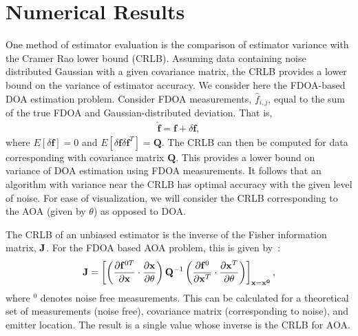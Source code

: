 \section{Numerical Results}
\label{s:numerics}

One method of estimator evaluation is the comparison of estimator variance with the Cramer Rao lower bound (CRLB). Assuming data containing noise distributed Gaussian with a given covariance matrix, the CRLB provides a lower bound on the variance of estimator accuracy. We consider here the FDOA-based DOA estimation problem. Consider FDOA measurements, $\hat{f}_{i,j}$, equal to the sum of the true FDOA and Gaussian-distributed deviation. That is,
\begin{align*}
\hat{\mathbf{f}} = \mathbf{f} + \delta \mathbf{f},
\end{align*}
where $E\left[\delta \mathbf{f}\right]=0$ and $E\left[\delta\mathbf{f}\delta\mathbf{f}^T\right]=\mathbf{Q}$. The CRLB can then be computed for data corresponding with covariance matrix $\mathbf{Q}$. This provides a lower bound on variance of DOA estimation using FDOA measurements. It follows that an algorithm with variance near the CRLB has optimal accuracy with the given level of noise. For ease of visualization, we will consider the CRLB corresponding to the AOA (given by $\theta$) as opposed to DOA.

The CRLB of an unbiased estimator is the inverse of the Fisher information matrix, $\mathbf{J}$. For the FDOA based AOA problem, this is given by~\cite{Ho1997}:
\begin{align*}
\mathbf{J} = \left[\left(\frac{\partial\mathbf{f}^{0T}}{\partial\mathbf{x}}\cdot\frac{\partial\mathbf{x}}{\partial\theta}\right)\mathbf{Q}^{-1}\left(\frac{\partial \mathbf{f}^0}{\partial\mathbf{x}^T}\cdot\frac{\partial\mathbf{x}^T}{\partial\theta}\right)\right]_{\mathbf{x=x^0}},
\end{align*}
where $^0$ denotes noise free measurements. This can be calculated for a theoretical set of measurements (noise free), covariance matrix (corresponding to noise), and emitter location. The result is a single value whose inverse is the CRLB for AOA.

